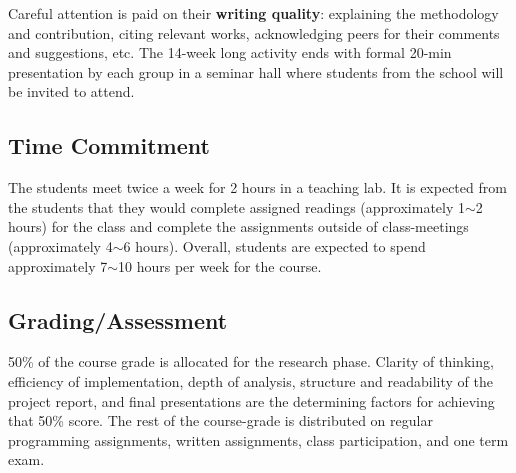 \documentclass{article}
\begin{document}
\par Careful attention is paid on their {\bf writing quality}: explaining the methodology and contribution, citing relevant works, acknowledging peers for their comments and suggestions, etc. The 14-week long activity ends with formal 20-min presentation by each group in a seminar hall where students from the school will be invited to attend.

\subsection{Time Commitment}

\par The students meet twice a week for 2 hours in a teaching lab. It is expected from the students that they would complete assigned readings (approximately 1$\sim$2 hours) for the class and complete the assignments outside of class-meetings (approximately 4$\sim$6 hours). Overall, students are expected to spend approximately 7$\sim$10 hours per week for the course.

\subsection{Grading/Assessment}
50\% of the course grade is allocated for the research phase. Clarity of thinking, efficiency of implementation, depth of analysis, structure and readability
of the project report, and final presentations are the determining factors for achieving that 50\% score. The rest of the course-grade is distributed on regular programming assignments, written assignments, class participation, and one term exam.
\end{document}
